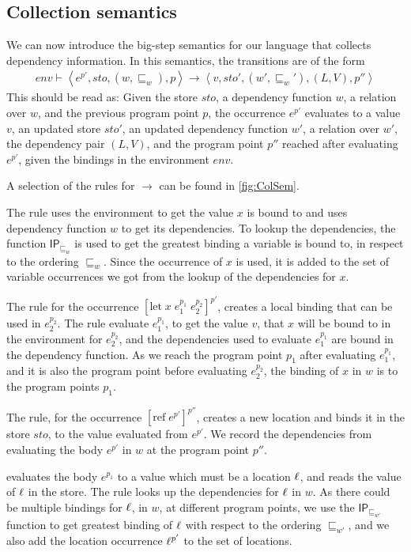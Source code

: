 \documentclass{llncs}
\newcommand{\uf}{\ensuremath{\mathsf{IP}}}
\newcommand{\sqleq}{\ensuremath{\sqsubseteq\xspace}}
\newcommand{\refc}{\ensuremath{\textrm{ref}\xspace}}
\begin{document}
\subsection{Collection semantics}\label{sec:sem}

We can now introduce the big-step semantics for our language that
collects dependency information. In this semantics, the transitions
are of the form
%
\begin{align*}
env\vdash\left\langle e^{p'},sto,(w,\sqleq_w),p\right\rangle\rightarrow\left\langle v,sto',(w',\sqleq_w'),(L,V),p''\right\rangle
\end{align*}
%
This should be read as: Given the store $sto$, a dependency function
$w$, a relation over $w$, and the previous program point $p$, the
occurrence $e^{p'}$ evaluates to a value $v$, an updated store $sto'$,
an updated dependency function $w'$, a relation over $w'$, the
dependency pair $(L,V)$, and the program point $p''$ reached after
evaluating $e^{p'}$, given the bindings in the environment $env$. 

A selection of the rules for $\rightarrow$ can be found in
\cref{fig:ColSem}.

The  rule  uses the environment to get the value $x$ is bound to and uses dependency function $w$ to get its dependencies.
		To lookup the dependencies, the function $\uf_{\sqleq_w}$ is used to get the greatest binding a variable is bound to, in respect to the ordering $\sqleq_w$.
		Since the occurrence of $x$ is used, it is added to the set of variable occurrences we got from the lookup of the dependencies for $x$.

The  rule for the occurrence $[\mbox{let}\;x\;e_1^{p_1}\;e_2^{p_2}]^{p'}$, creates a local binding that can be used in $e_2^{p_2}$.
		The  rule evaluate $e_1^{p_1}$, to get the value $v$, that $x$ will be bound to in the environment for $e_2^{p_2}$, and the dependencies used to evaluate $e_1^{p_1}$ are bound in the dependency function.
		As we reach the program point $p_1$ after evaluating $e_1^{p_1}$, and it is also the program point before evaluating $e_2^{p_2}$, the binding of $x$ in $w$ is to the program points $p_1$.	

The  rule, for the occurrence $[\refc\;e^{p'}]^{p''}$,
creates a new location and binds it in the store $sto$, to the value
evaluated from $e^{p'}$. We record the dependencies from evaluating
the body $e^{p'}$ in $w$ at the program point $p''$.

 evaluates the body $e^{p_1}$ to a value which
must be a location $\ell$, and reads the value of $\ell$ in the store.
		The  rule looks up the dependencies for
                $\ell$ in $w$.
		As there could be multiple bindings for $\ell$, in $w$, at different program points, we use the $\uf_{\sqleq_{w'}}$ function to get greatest binding of $\ell$ with respect to the ordering $\sqleq_{w'}$, 
		and we also add the location occurrence $\ell^{p'}$ to the set of locations.
\end{document}
